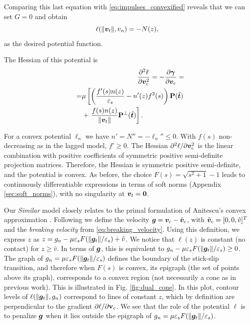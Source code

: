Comparing this last equation with \eqref{eq:impulses_convexified} reveals that we can
set $G=0$ and obtain
\begin{equation}
    \ell(\Vert\vf{v}_t\Vert,v_n) = -N(z),
    \label{eq:similar_potential}
\end{equation}
as the desired potential function.

The Hessian of this potential is
\begin{eqnarray*}
    &&\frac{\partial^2\ell}{\partial{\bm{v}}_c^2}=-\frac{\partial{\bm\gamma}}{\partial{\bm{v}}_c}=\\
    &&\begin{split} =&\mu\left[
        \left(\frac{f'(s)n(z)}{\varepsilon_s}-n'(z)f^2(s)\right){\mathbf{P}}(\hat{{\bm{t}}})\right.\\
    &+\left.\frac{f(s)n(z)}{\Vert{\bm{v}}_t\Vert}{\mathbf{P}}^\perp(\hat{{\bm{t}}})\right].
    \end{split}\nonumber
\end{eqnarray*}

For a convex potential $\ell_n$ we have $n'=N''=-\ell_n'' \leq 0$. With $f(s)$
non-decreasing as in the lagged model, $f'\ge 0$. The Hessian
$\partial^2\ell/\partial{\bm{v}}_c^2$ is the linear combination with positive
coefficients of symmetric positive semi-definite projection matrices. Therefore,
the Hessian is symmetric positive semi-definite, and the potential is convex. As
before, the choice $F(s)=\sqrt{s^2+1}-1$ leads to continuously differentiable
expressions in terms of soft norms (Appendix \ref{sec:soft_norms}), with no
singularity at ${\bm{v}}_t={\bm{0}}$.

Our \emph{Similar} model closely relates to the primal formulation
\cite{bib:mazhar2014,bib:castro2022unconstrained} of Anitescu's convex
approximation \cite{bib:anitescu2006}. Following
\cite{bib:castro2022unconstrained} we define the velocity ${\bm{g}} = {\bm{v}}_c -
\hat{{\bm{v}}}_c$, with $\hat{{\bm{v}}}_c=[0, 0, \hat{v}]^T$ and the \emph{breaking
velocity} from \eqref{eq:breaking_velocity}. Using this definition, we express $z$
as $z = g_n-\mu \varepsilon_sF(\Vert{\bm{g}}_t\Vert/\varepsilon_s) + \hat{v}$. We
notice that $\ell(z)$ is constant (no contact) for $z\ge\hat{v}$. In terms of
${\bm{g}}$, this is equivalent to $g_n-\mu
\varepsilon_sF(\Vert{\bm{g}}_t\Vert/\varepsilon_s) \ge 0$. The graph of $g_n=\mu
\varepsilon_sF(\Vert{\bm{g}}_t\Vert/\varepsilon_s)$ defines the boundary of the
stick-slip transition, and therefore when $F(s)$ is convex, its epigraph (the
set of points above its graph), corresponds to a convex region (not necessarily
a cone as in previous work). This is illustrated in Fig. \ref{fig:dual_cone}. In
this plot, contour levels of $\ell(\Vert{\bm{g}}_t\Vert,g_n)$ correspond to lines
of constant $z$, which by definition are perpendicular to the gradient
$\partial\ell/\partial{\mathbf{v}}_c$. We see that the role of the potential $\ell$ is
to penalize ${\bm{g}}$ when it lies outside the epigraph of $g_n=\mu
\varepsilon_sF(\Vert{\bm{g}}_t\Vert/\varepsilon_s)$.

